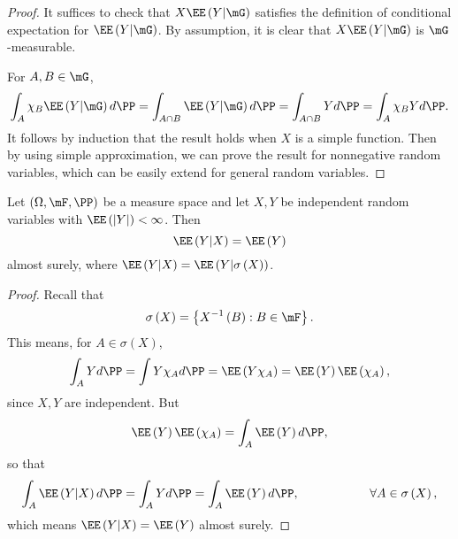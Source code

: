 \documentclass[stat901]{subfiles}
\begin{document}
    \begin{proof}
        It suffices to check that $X\EE\left( Y|\mG \right)$ satisfies the definition of conditional expectation for $\EE\left( Y|\mG \right)$. By assumption, it is clear that $X\EE\left( Y|\mG \right)$ is $\mG$-measurable.

        For $A,B\in\mG$,
        \begin{equation*}
            \int_A \chi_B\EE\left( Y|\mG \right)d\PP = \int_{A\cap B} \EE\left( Y|\mG \right)d\PP = \int_{A\cap B} Yd\PP = \int_A \chi_BYd\PP.
        \end{equation*}
        It follows by induction that the result holds when $X$ is a simple function. Then by using simple approximation, we can prove the result for nonnegative random variables, which can be easily extend for general random variables.
    \end{proof}

    \begin{theorem}{}
        Let $\left( \Omega,\mF,\PP \right)$ be a measure space and let $X,Y$ be independent random variables with $\EE\left( \left| Y \right| \right)<\infty$. Then
        \begin{equation*}
            \EE\left( Y|X \right) = \EE\left( Y \right)
        \end{equation*}
        almost surely, where $\EE\left( Y|X \right) = \EE\left( Y|\sigma\left( X \right) \right)$.
    \end{theorem}

    \clearpage

    \begin{proof}
        Recall that
        \begin{equation*}
            \sigma\left( X \right) = \left\lbrace X^{-1}\left( B \right) :B\in\mF \right\rbrace.
        \end{equation*}
        This means, for $A\in\sigma\left( X \right)$,
        \begin{equation*}
            \int_A Yd\PP = \int Y\chi_Ad\PP = \EE\left( Y\chi_A \right) = \EE\left( Y \right)\EE\left( \chi_A \right),
        \end{equation*}
        since $X,Y$ are independent. But
        \begin{equation*}
            \EE\left( Y \right)\EE\left( \chi_A \right) = \int_A\EE\left( Y \right)d\PP,
        \end{equation*}
        so that
        \begin{equation*}
            \int_A\EE\left( Y|X \right)d\PP = \int_A Yd\PP = \int_A\EE\left( Y \right)d\PP, \hspace{2cm}\forall A\in\sigma\left( X \right),
        \end{equation*}
        which means $\EE\left( Y|X \right) = \EE\left( Y \right)$ almost surely.
    \end{proof}
    
\end{document}
